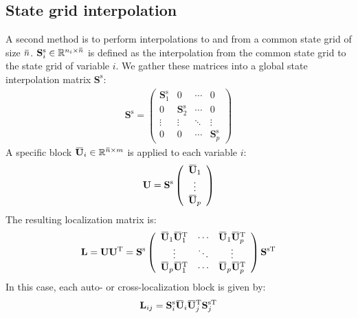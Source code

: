 \documentclass[12pt]{scrartcl}
\newcommand{\overbar}[1]{\mkern 1.5mu\overline{\mkern-1.5mu#1\mkern-1.5mu}\mkern 1.5mu}
\begin{document}
\subsection{State grid interpolation}
A second method is to perform interpolations to and from a common state grid of size $\overbar{n}$. $\mathbf{S}^\mathrm{s}_i \in \mathbb{R}^{n_i \times \overbar{n}}$ is defined as the interpolation from the common state grid to the state grid of variable $i$. We gather these matrices into a global state interpolation matrix $\mathbf{S}^\mathrm{s}$:
\begin{align}
\mathbf{S}^\mathrm{s} = \left( \begin{array}{cccc}
\mathbf{S}^\mathrm{s}_1 & 0 & \cdots & 0 \\
0 & \mathbf{S}^\mathrm{s}_2 & \cdots & 0 \\
\vdots & \vdots & \ddots & \vdots \\
0 & 0 & \cdots & \mathbf{S}^\mathrm{s}_p
\end{array} \right)
\end{align}
A specific block $\overbar{\mathbf{U}}_i \in \mathbb{R}^{\overbar{n} \times m}$ is applied to each variable $i$:
\begin{align}
\mathbf{U} = \mathbf{S}^\mathrm{s} \left( \begin{array}{c}
\overbar{\mathbf{U}}_1 \\
\vdots \\
\overbar{\mathbf{U}}_p
\end{array} \right)
\end{align}
The resulting localization matrix is:
\begin{align}
\mathbf{L} = \mathbf{U} \mathbf{U}^\mathrm{T} = \mathbf{S}^\mathrm{s} \left( \begin{array}{ccc}
\overbar{\mathbf{U}}_1 \overbar{\mathbf{U}}_1^\mathrm{T} & \cdots & \overbar{\mathbf{U}}_1 \overbar{\mathbf{U}}_p^\mathrm{T} \\
\vdots & \ddots & \vdots  \\
\overbar{\mathbf{U}}_p \overbar{\mathbf{U}}_1^\mathrm{T} & \cdots & \overbar{\mathbf{U}}_p \overbar{\mathbf{U}}_p^\mathrm{T}
\end{array} \right) \mathbf{S}^{\mathrm{s} \mathrm{T}}
\end{align}
In this case, each auto- or cross-localization block is given by:
\begin{align}
\mathbf{L}_{ij} = \mathbf{S}^\mathrm{s}_i \overbar{\mathbf{U}}_i \overbar{\mathbf{U}}_j^\mathrm{T} \mathbf{S}_j^{\mathrm{s} \mathrm{T}}
\end{align}
\end{document}
